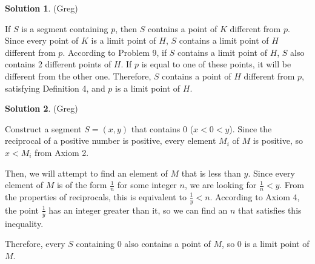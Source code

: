 \documentclass{article}
\theoremstyle{definition}
\newtheorem{solution}{Solution}
\begin{document}
\begin{solution} %
(Greg)

If $S$ is a segment containing $p$, then $S$ contains a point of $K$ different from $p$.
Since every point of $K$ is a limit point of $H$, $S$ contains a limit point of $H$ different from $p$.
According to Problem 9, if $S$ contains a limit point of $H$, $S$ also contains 2 different points of $H$.
If $p$ is equal to one of these points, it will be different from the other one.
Therefore, $S$ contains a point of $H$ different from $p$, satisfying Definition 4, and $p$ is a limit point of $H$.
\end{solution}

\begin{solution} %
(Greg)

Construct a segment $S = (x, y)$ that contains $0$ ($x < 0 < y$).
Since the reciprocal of a positive number is positive, every element $M_i$ of $M$ is positive, so $x < M_i$ from Axiom 2.

Then, we will attempt to find an element of $M$ that is less than $y$.
Since every element of $M$ is of the form $\frac{1}{n}$ for some integer $n$, we are looking for $\frac{1}{n} < y$.
From the properties of reciprocals, this is equivalent to $\frac{1}{y} < n$.
According to Axiom 4, the point $\frac{1}{y}$ has an integer greater than it, so we can find an $n$ that satisfies this inequality.

Therefore, every $S$ containing $0$ also contains a point of $M$, so $0$ is a limit point of $M$.
\end{solution}
\end{document}

